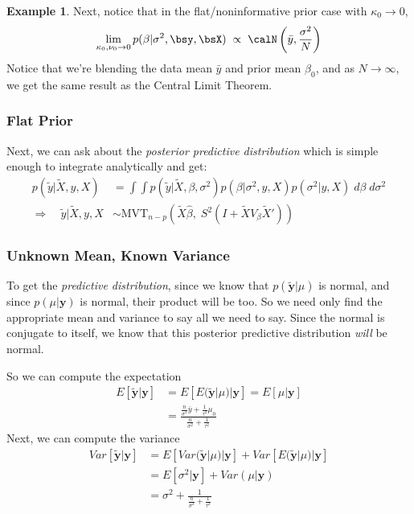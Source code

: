\documentclass[12pt]{article}
\theoremstyle{plain}
\theoremstyle{definition}
\newtheorem{ex}[thm]{Example}
\theoremstyle{remark}
\newcommand{\ra}{\rightarrow}
\newcommand{\sumnN}{\sum^N_{n=1}}
\begin{document}
\begin{ex}
Next, notice that in the flat/noninformative prior case with
$\kappa_0\ra 0$,
\begin{align*}
  \lim_{\kappa_0,\nu_0\ra 0}
  p(\beta|\sigma^2,\bsy,\bsX)
  \;\propto\;
  \calN\left(\bar{y},\frac{\sigma^2}{N}\right)
\end{align*}
Notice that we're blending the data mean $\bar{y}$ and prior
mean $\beta_0$, and as $N\rightarrow \infty$, we get the same
result as the Central Limit Theorem.
\end{ex}



\clearpage
\subsubsection{Flat Prior}

Next, we can ask about the \emph{posterior predictive distribution}
which is simple enough to integrate analytically and get:
\begin{align*}
   p(\tilde{y} | \tilde{X}, y, X) &= \int \int p(\tilde{y} | \tilde{X},
      \beta, \sigma^2 ) p(\beta | \sigma^2, y, X) p(\sigma^2|y, X)
      \; d\beta \; d\sigma^2 \\
      \Rightarrow \quad \tilde{y} | \tilde{X}, y, X &\sim
      \text{MVT}_{n-p}(\tilde{X} \hat{\beta}, \;
      S^2( I + \tilde{X} V_\beta \tilde{X}'))
\end{align*}

\subsubsection{Unknown Mean, Known Variance}


To get the \emph{predictive distribution}, since we know that
$p(\tilde{\mathbf{y}} | \mu)$ is normal, and since $p(\mu | \mathbf{y})$
is normal, their product will be too. So we need only find the
appropriate mean and variance to say all we need to say.
Since the normal is conjugate to itself, we know that this
      posterior predictive distribution \emph{will} be normal.

  So we can compute the expectation
      \begin{align*}
	 E[\tilde{\mathbf{y}} | \mathbf{y} ] &=
	    E[ E(\tilde{\mathbf{y}} | \mu) |  \mathbf{y} ]
	    = E[\mu | \mathbf{y}]
	 \\
	 &= \frac{\frac{n}{\sigma^2} \bar{y}
	 + \frac{1}{\tau^2} \mu_0}{\frac{n}{\sigma^2} + \frac{1}{\tau^2}}
      \end{align*}
Next, we can compute the variance
      \begin{align*}
	 Var[\tilde{\mathbf{y}} | \mathbf{y} ] &=
	    E[ Var(\tilde{\mathbf{y}} | \mu) |  \mathbf{y} ]
	    + Var[ E(\tilde{\mathbf{y}} | \mu) | \mathbf{y} ]
	 \\
	 &= E[ \sigma^2 | \mathbf{y} ] + Var( \mu | \mathbf{y})
	 \\
	 &= \sigma^2 + \frac{1}{\frac{n}{\sigma^2} + \frac{1}{\tau^2}}
      \end{align*}
\end{document}
